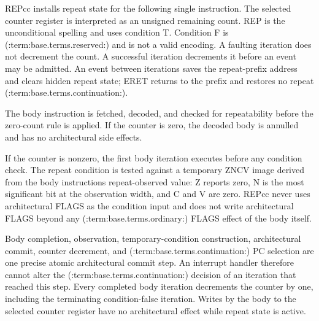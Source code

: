 REPcc installs repeat state for the following single instruction. The selected counter register is interpreted as an unsigned remaining count. REP is the unconditional spelling and uses condition T. Condition F is (:term:base.terms.reserved:) and is not a valid encoding. A faulting iteration does not decrement the count. A successful iteration decrements it before an event may be admitted. An event between iterations saves the repeat-prefix address and clears hidden repeat state; ERET returns to the prefix and restores no repeat (:term:base.terms.continuation:).

The body instruction is fetched, decoded, and checked for repeatability before the zero-count rule is applied. If
the counter is zero, the decoded body is annulled and has no architectural side effects.

If the counter is nonzero, the first body iteration executes before any condition check. The repeat condition is
tested against a temporary ZNCV image derived from the body instruction\textquotesingle{}s repeat-observed value: Z reports zero, N is
the most significant bit at the observation width, and C and V are zero. REPcc never uses architectural FLAGS as the
condition input and does not write architectural FLAGS beyond any (:term:base.terms.ordinary:) FLAGS effect of the body itself.

Body completion, observation, temporary-condition construction, architectural commit, counter decrement, and
(:term:base.terms.continuation:) PC selection are one precise atomic architectural commit step. An interrupt handler therefore cannot
alter the (:term:base.terms.continuation:) decision of an iteration that reached this step. Every completed body iteration decrements the
counter by one, including the terminating condition-false iteration. Writes by the body to the selected counter
register have no architectural effect while repeat state is active.

